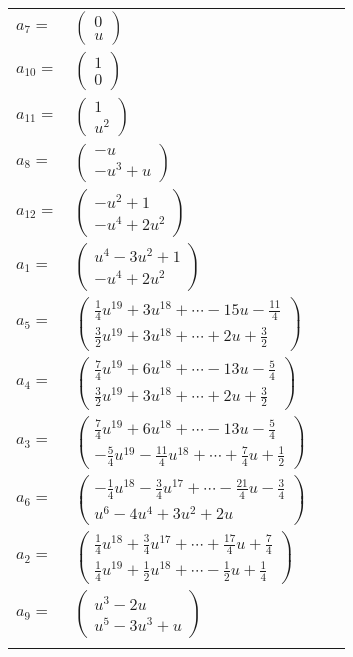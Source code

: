 \documentclass[1p]{elsarticle_modified}
\theoremstyle{definition}
\begin{document}
\begin{tabular}{m{7pt} m{180pt} m{7pt} m{180pt} }
\flushright $a_{7}=$&$\begin{pmatrix}0\\u\end{pmatrix}$ \\
\flushright $a_{10}=$&$\begin{pmatrix}1\\0\end{pmatrix}$ \\
\flushright $a_{11}=$&$\begin{pmatrix}1\\u^2\end{pmatrix}$ \\
\flushright $a_{8}=$&$\begin{pmatrix}- u\\- u^3+u\end{pmatrix}$ \\
\flushright $a_{12}=$&$\begin{pmatrix}- u^2+1\\- u^4+2 u^2\end{pmatrix}$ \\
\flushright $a_{1}=$&$\begin{pmatrix}u^4-3 u^2+1\\- u^4+2 u^2\end{pmatrix}$ \\
\flushright $a_{5}=$&$\begin{pmatrix}\frac{1}{4} u^{19}+3 u^{18}+\cdots-15 u-\frac{11}{4}\\\frac{3}{2} u^{19}+3 u^{18}+\cdots+2 u+\frac{3}{2}\end{pmatrix}$ \\
\flushright $a_{4}=$&$\begin{pmatrix}\frac{7}{4} u^{19}+6 u^{18}+\cdots-13 u-\frac{5}{4}\\\frac{3}{2} u^{19}+3 u^{18}+\cdots+2 u+\frac{3}{2}\end{pmatrix}$ \\
\flushright $a_{3}=$&$\begin{pmatrix}\frac{7}{4} u^{19}+6 u^{18}+\cdots-13 u-\frac{5}{4}\\-\frac{5}{4} u^{19}-\frac{11}{4} u^{18}+\cdots+\frac{7}{4} u+\frac{1}{2}\end{pmatrix}$ \\
\flushright $a_{6}=$&$\begin{pmatrix}-\frac{1}{4} u^{18}-\frac{3}{4} u^{17}+\cdots-\frac{21}{4} u-\frac{3}{4}\\u^6-4 u^4+3 u^2+2 u\end{pmatrix}$ \\
\flushright $a_{2}=$&$\begin{pmatrix}\frac{1}{4} u^{18}+\frac{3}{4} u^{17}+\cdots+\frac{17}{4} u+\frac{7}{4}\\\frac{1}{4} u^{19}+\frac{1}{2} u^{18}+\cdots-\frac{1}{2} u+\frac{1}{4}\end{pmatrix}$ \\
\flushright $a_{9}=$&$\begin{pmatrix}u^3-2 u\\u^5-3 u^3+u\end{pmatrix}$\\&\end{tabular}
\end{document}
